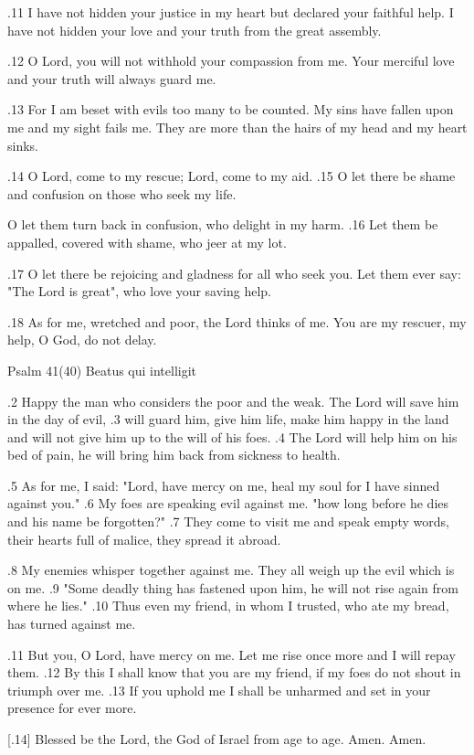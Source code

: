 .11 I have not hidden your justice in my heart
but declared your faithful help.
I have not hidden your love and your truth
from the great assembly.

.12 O Lord, you will not withhold
your compassion from me.
Your merciful love and your truth
will always guard me.

.13 For I am beset with evils
too many to be counted.
My sins have fallen upon me
and my sight fails me.
They are more than the hairs of my head
and my heart sinks.

.14 O Lord, come to my rescue;
Lord, come to my aid.
.15 O let there be shame and confusion
on those who seek my life.

O let them turn back in confusion,
who delight in my harm.
.16 Let them be appalled, covered with shame,
who jeer at my lot.

.17 O let there be rejoicing and gladness
for all who seek you.
Let them ever say: "The Lord is great",
who love your saving help.

.18 As for me, wretched and poor,
the Lord thinks of me.
You are my rescuer, my help,
O God, do not delay.


Psalm 41(40) Beatus qui intelligit

.2 Happy the man who considers the poor and the weak.
The Lord will save him in the day of evil,
.3 will guard him, give him life, make him happy in the land
and will not give him up to the will of his foes.
.4 The Lord will help him on his bed of pain,
he will bring him back from sickness to health.

.5 As for me, I said: "Lord, have mercy on me,
heal my soul for I have sinned against you."
.6 My foes are speaking evil against me.
"how long before he dies and his name be forgotten?"
.7 They come to visit me and speak empty words,
their hearts full of malice, they spread it abroad.

.8 My enemies whisper together against me.
They all weigh up the evil which is on me.
.9 "Some deadly thing has fastened upon him,
he will not rise again from where he lies."
.10 Thus even my friend, in whom I trusted,
who ate my bread, has turned against me.

.11 But you, O Lord, have mercy on me.
Let me rise once more and I will repay them.
.12 By this I shall know that you are my friend,
if my foes do not shout in triumph over me.
.13 If you uphold me I shall be unharmed
and set in your presence for ever more.


[.14] Blessed be the Lord, the God of Israel
from age to age. Amen. Amen.
